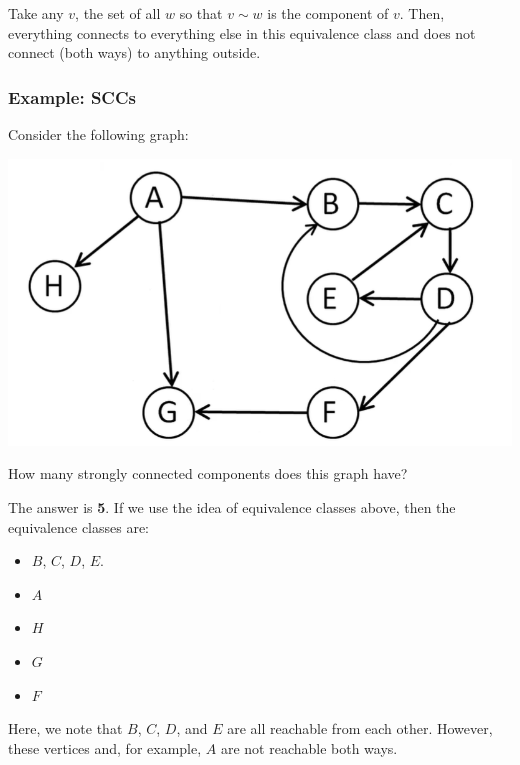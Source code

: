\documentclass[letterpaper]{article}
\begin{document}
\bigskip 

Take any $v$, the set of all $w$ so that $v \sim w$ is the component of $v$. Then, everything connects to everything else in this equivalence class and does not connect (both ways) to anything outside. 

\subsubsection{Example: SCCs}
Consider the following graph:
\begin{center}
    \includegraphics[scale=0.4]{../assets/scc.png}
\end{center}
How many strongly connected components does this graph have? 

\begin{mdframed}[]
    The answer is \textbf{5}. If we use the idea of equivalence classes above, then the equivalence classes are: 
    \begin{itemize}
        \item $B$, $C$, $D$, $E$. 
        \item $A$
        \item $H$
        \item $G$
        \item $F$
    \end{itemize}
    Here, we note that $B$, $C$, $D$, and $E$ are all reachable from each other. However, these vertices and, for example, $A$ are not reachable both ways. 
\end{mdframed}
\end{document}
